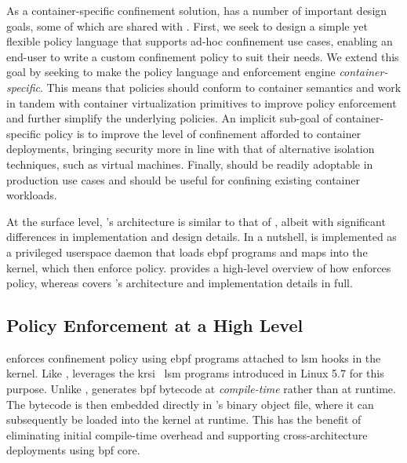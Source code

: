 As a container-specific confinement solution, \bpfcontain{} has a number of important
design goals, some of which are shared with \bpfbox{}. First, we seek to design a simple
yet flexible policy language that supports ad-hoc confinement use cases, enabling an
end-user to write a custom confinement policy to suit their needs. We extend this goal by
seeking to make the policy language and enforcement engine \textit{container-specific}.
This means that \bpfcontain{} policies should conform to container semantics and work in
tandem with container virtualization primitives to improve policy enforcement and further
simplify the underlying policies. An implicit sub-goal of container-specific policy is to
improve the level of confinement afforded to container deployments, bringing security more
in line with that of alternative isolation techniques, such as virtual machines. Finally,
\bpfcontain{} should be readily adoptable in production use cases and should be useful for
confining existing container workloads.

At the surface level, \bpfcontain{}'s architecture is similar to that of \bpfbox{}, albeit
with significant differences in implementation and design details. In a nutshell,
\bpfcontain{} is implemented as a privileged userspace daemon that loads \gls{ebpf}
programs and maps into the kernel, which then enforce policy.
 provides a high-level overview of how
\bpfcontain{} enforces policy, whereas  covers
\bpfcontain{}'s architecture and implementation details in full.

\subsection{Policy Enforcement at a High Level}%
\label{ss:bpfcontain-enforcement-overview}

\bpfcontain{} enforces confinement policy using \gls{ebpf} programs attached to \gls{lsm}
hooks in the kernel. Like \bpfbox{}, \bpfcontain{} leverages the
\gls{krsi}~\cite{singh2019_krsi} \gls{lsm} programs introduced in Linux 5.7 for this
purpose. Unlike \bpfbox{}, \bpfcontain{} generates \gls{bpf} bytecode at
\textit{compile-time} rather than at runtime. The bytecode is then embedded directly in
\bpfcontain{}'s binary object file, where it can subsequently be loaded into the kernel at
runtime. This has the benefit of eliminating initial compile-time overhead and supporting
cross-architecture deployments using \gls{bpf} \gls{core}.

